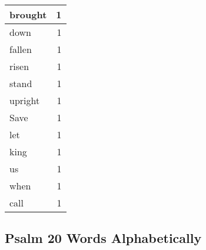 \begin{center}
\begin{longtable}{l|r}
brought & 1\\ \hline 
down & 1\\ \hline 
fallen & 1\\ \hline 
risen & 1\\ \hline 
stand & 1\\ \hline 
upright & 1\\ \hline 
Save & 1\\ \hline 
let & 1\\ \hline 
king & 1\\ \hline 
us & 1\\ \hline 
when & 1\\ \hline 
call & 1\\ \hline 
\end{longtable}
\end{center}





\subsection{Psalm 20 Words Alphabetically}


\normalsize
 
